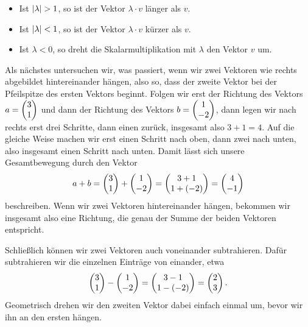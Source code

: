 \documentclass[../../main.tex]{subfiles}
\begin{document}
\begin{itemize}
    \item Ist $\lvert\lambda\rvert>1$, so ist der Vektor $\lambda\cdot v$ länger als $v$.
    \item Ist $\lvert\lambda\rvert<1$, so ist der Vektor $\lambda\cdot v$ kürzer als $v$.
    \item Ist $\lambda<0$, so dreht die Skalarmultiplikation mit $\lambda$ den Vektor $v$ um.
\end{itemize}
Als nächstes untersuchen wir, was passiert, wenn wir zwei Vektoren wie rechts abgebildet hintereinander hängen, also so,
dass der zweite Vektor bei der Pfeilspitze des ersten Vektors beginnt. Folgen wir erst der Richtung des Vektors $a=\begin{pmatrix} 3\\ 1 \end{pmatrix}$ und
dann der Richtung des Vektors $b=\begin{pmatrix} 1\\ -2 \end{pmatrix}$, dann legen wir nach rechts erst drei Schritte, dann einen zurück,
insgesamt also $3+1=4$. Auf die gleiche Weise machen wir erst einen Schritt nach oben, dann zwei nach unten, also
insgesamt einen Schritt nach unten. Damit lässt sich unsere Gesamtbewegung durch den Vektor 
\[a+b=\begin{pmatrix} 3\\ 1 \end{pmatrix}+\begin{pmatrix} 1\\ -2 \end{pmatrix}=\begin{pmatrix} 3+1\\ 1+(-2) \end{pmatrix}=\begin{pmatrix} 4\\ -1 \end{pmatrix}\]
beschreiben. Wenn wir zwei Vektoren hintereinander hängen, bekommen wir insgesamt also eine Richtung, die genau der
Summe der beiden Vektoren entspricht.

Schließlich können wir zwei Vektoren auch voneinander subtrahieren. Dafür subtrahieren wir die einzelnen Einträge von 
einander, etwa
\[\begin{pmatrix} 3\\ 1 \end{pmatrix}-\begin{pmatrix} 1\\ -2 \end{pmatrix}=\begin{pmatrix} 3-1\\ 1-(-2) \end{pmatrix}=\begin{pmatrix} 2\\ 3 \end{pmatrix}.\]
Geometrisch drehen wir den zweiten Vektor dabei einfach einmal um, bevor wir ihn an den ersten hängen.
\end{document}
